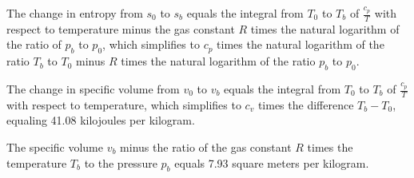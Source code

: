 The change in entropy from \( s_0 \) to \( s_b \) equals the integral from \( T_0 \) to \( T_b \) of \( \frac{c_p}{T} \) with respect to temperature minus the gas constant \( R \) times the natural logarithm of the ratio of \( p_b \) to \( p_0 \), which simplifies to \( c_p \) times the natural logarithm of the ratio \( T_b \) to \( T_0 \) minus \( R \) times the natural logarithm of the ratio \( p_b \) to \( p_0 \).

The change in specific volume from \( v_0 \) to \( v_b \) equals the integral from \( T_0 \) to \( T_b \) of \( \frac{c_p}{T} \) with respect to temperature, which simplifies to \( c_v \) times the difference \( T_b - T_0 \), equaling 41.08 kilojoules per kilogram.

The specific volume \( v_b \) minus the ratio of the gas constant \( R \) times the temperature \( T_b \) to the pressure \( p_b \) equals 7.93 square meters per kilogram.